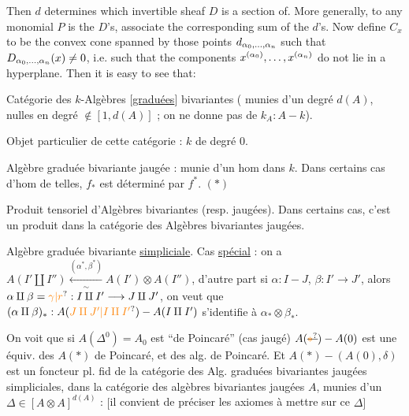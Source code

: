 Then $d$ determines which invertible sheaf $D$ is a section of. More generally, to any monomial $P$ is the $D$'s, associate the corresponding sum of the $d$'s. Now define $C_x$ to be the convex cone spanned by those points $d_{\alpha_0,\ldots,\alpha_n}$ such that $D_{\alpha_0,\ldots,\alpha_n}(x)\ne0$, i.e. such that the components $x^{(\alpha_0)},\ldots,x^{(\alpha_n)}$ do not lie in a hyperplane. Then it is easy to see that:

Catégorie des $k$-Algèbres $[$\uline{graduées}$]$
 bivariantes ( munies d'un degré $d(A)$, nulles en degré $\notin[1,d(A)]$ ; on ne donne pas de $k_A:A-k$).

Objet particulier de cette catégorie : $k$ de degré 0.

Algèbre graduée bivariante jaugée : munie d'un hom dans $k$. Dans certains cas d'hom de telles, $f_*$ est déterminé par $f^*$. $(*)$

Produit tensoriel d'Algèbres bivariantes (resp. jaugées). Dans certains cas, c'est un produit dans la catégorie des Algèbres bivariantes jaugées.

Algèbre graduée bivariante  \uline{simpliciale}.  Cas \uline{spécial} : on a $A(I'\amalg I'')\xleftarrow[\sim]{(\alpha^*,\beta^*)}A(I')\otimes A(I'')$, d'autre part si $\alpha:I-J$, $\beta:I'\to J'$, alors $\alpha\amalg\beta=\unsure{\gamma|r}:I\amalg I'\longrightarrow J\amalg J'$, on veut que $(\alpha\amalg\beta)_*:A(\unsure{J\amalg J'|I\amalg I'})-A(I\amalg I')$ s'identifie à $\alpha_*\otimes\beta_*$.

On voit que si $A(\Delta^0)=A_0$ est ``de Poincaré'' (cas jaugé) $A(\deleted{\unsure{*}})-A(0)$ est une équiv. des $A(*)$  de Poincaré, et des alg. de Poincaré. Et $A(*)-(A(0),\delta)$ est un foncteur pl. fid de la catégorie des Alg. graduées bivariantes jaugées simpliciales, dans la catégorie des algèbres  bivariantes jaugées $A$, munies d'un $\Delta\in[A\otimes A]^{d(A)}$ : $[$il convient de préciser les axiomes à mettre sur ce $\Delta]$

